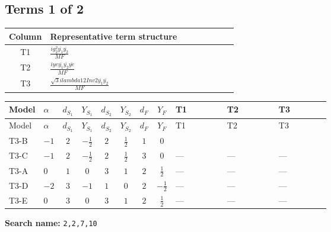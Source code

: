 \documentclass[8pt]{article}
\begin{document}
\begin{landscape}
\subsection*{Terms 1 of 2}
\begin{center}
\begin{tabular}{@{}c >{\raggedright\arraybackslash}p{0.82\linewidth}@{}}
\toprule
Column & Representative term structure \\
\midrule
T1 & \(\displaystyle \frac{i g_{2}^{2} \overline{y_{1}} \overline{y_{2}}}{MF}\) \\
\midrule
T2 & \(\displaystyle \frac{i ye \overline{y_{1}} \overline{y_{2}} \overline{ye}}{MF}\) \\
\midrule
T3 & \(\displaystyle \frac{\sqrt{3} i lambda12Inv2 \overline{y_{1}} \overline{y_{2}}}{MF}\) \\
\midrule
\bottomrule
\end{tabular}
\end{center}
\smallskip
\tiny
\begin{longtable}{@{}llcccccc >{\raggedright\arraybackslash}p{0.21\linewidth} >{\raggedright\arraybackslash}p{0.21\linewidth} >{\raggedright\arraybackslash}p{0.21\linewidth}@{}}
\toprule
Model & $\alpha$ & $d_{S_1}$ & $Y_{S_1}$ & $d_{S_2}$ & $Y_{S_2}$ & $d_F$ & $Y_F$ & T1 & T2 & T3 \\
\midrule
\endfirsthead
\toprule
Model & $\alpha$ & $d_{S_1}$ & $Y_{S_1}$ & $d_{S_2}$ & $Y_{S_2}$ & $d_F$ & $Y_F$ & T1 & T2 & T3 \\
\midrule
\endhead
T3-B & $-1$ & $2$ & $-\frac{1}{2}$ & $2$ & $\frac{1}{2}$ & $1$ & $0$ & \scriptsize\adjustbox{max width=\linewidth}{$\begin{gathered} \frac{3 i g_{2}^{2} \overline{y_{1}} \overline{y_{2}}}{4 MF}\end{gathered}$} & \scriptsize\adjustbox{max width=\linewidth}{$\begin{gathered} - \frac{i ye \overline{y_{1}} \overline{y_{2}} \overline{ye}}{4 MF}\end{gathered}$} & \scriptsize\adjustbox{max width=\linewidth}{$\begin{gathered} \frac{\sqrt{3} i lambda12Inv2 \overline{y_{1}} \overline{y_{2}}}{3 MF}\end{gathered}$} \\
\midrule
T3-C & $-1$ & $2$ & $-\frac{1}{2}$ & $2$ & $\frac{1}{2}$ & $3$ & $0$ & --- & --- & --- \\
\midrule
T3-A & $0$ & $1$ & $0$ & $3$ & $1$ & $2$ & $\frac{1}{2}$ & --- & --- & --- \\
\midrule
T3-D & $-2$ & $3$ & $-1$ & $1$ & $0$ & $2$ & $-\frac{1}{2}$ & --- & --- & --- \\
\midrule
T3-E & $0$ & $3$ & $0$ & $3$ & $1$ & $2$ & $\frac{1}{2}$ & --- & --- & --- \\
\midrule
\bottomrule
\end{longtable}
\clearpage
\noindent\textbf{Search name: }\texttt{2,2,7,10}\par\smallskip

\end{landscape}
\end{document}

